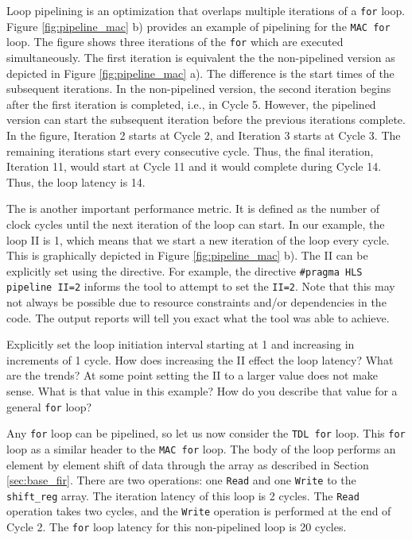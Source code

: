 Loop pipelining is an optimization that overlaps multiple iterations of a \lstinline{for} loop. Figure \ref{fig:pipeline_mac} b) provides an example of pipelining for the \lstinline{MAC for} loop. The figure shows three iterations of the \lstinline{for} which are executed simultaneously. The first iteration is equivalent the the non-pipelined version as depicted in Figure \ref{fig:pipeline_mac} a). The difference is the start times of the subsequent iterations. In the non-pipelined version, the second iteration begins after the first iteration is completed, i.e., in Cycle 5. However, the pipelined version can start the subsequent iteration before the previous iterations complete. In the figure, Iteration 2 starts at Cycle 2, and Iteration 3 starts at Cycle 3. The remaining iterations start every consecutive cycle. Thus, the final iteration, Iteration 11, would start at Cycle 11 and it would complete during Cycle 14. Thus, the loop latency is 14.

The  is another important performance metric. It is defined as the number of clock cycles until the next iteration of the loop can start. In our example, the loop II is 1, which means that we start a new iteration of the loop every cycle. This is graphically depicted in Figure \ref{fig:pipeline_mac} b). The II can be explicitly set using the directive. For example, the directive \lstinline{#pragma HLS pipeline II=2} informs the \VHLS tool to attempt to set the \lstinline{II=2}. Note that this may not always be possible due to resource constraints and/or dependencies in the code. The output reports will tell you exact what the \VHLS tool was able to achieve. 

\begin{exercise}
Explicitly set the loop initiation interval starting at 1 and increasing in increments of 1 cycle. How does increasing the II effect the loop latency? What are the trends?  At some point setting the II to a larger value does not make sense. What is that value in this example? How do you describe that value for a general \lstinline{for} loop?
\end{exercise}



Any \lstinline{for} loop can be pipelined, so let us now consider the \lstinline{TDL for} loop. This \lstinline{for} loop as a similar header to the \lstinline{MAC for} loop. The body of the loop performs an element by element shift of data through the array as described in Section \ref{sec:base_fir}. There are two operations: one \lstinline{Read} and one \lstinline{Write} to the \lstinline{shift_reg} array. The iteration latency of this loop is 2 cycles. The \lstinline{Read} operation takes two cycles, and the \lstinline{Write} operation is performed at the end of Cycle 2. The \lstinline{for} loop latency for this non-pipelined loop is 20 cycles.

